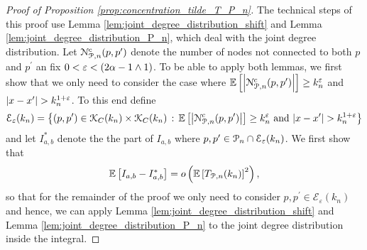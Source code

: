 \begin{proof}[Proof of Proposition \ref{prop:concentration_tilde_T_P_n}]
The technical steps of this proof use Lemma \ref{lem:joint_degree_distribution_shift} and Lemma \ref{lem:joint_degree_distribution_P_n}, which deal with the joint degree distribution. Let ${\mathcal N}_{{\mathcal P},n}^c(p,p^\prime)$ denote the number of nodes not connected to both $p$ and $p^\prime$ an fix $0 < \varepsilon < (2\alpha - 1 \wedge 1)$. To be able to apply both lemmas, we first show that we only need to consider the case where $\mathbb{E}\left[\left|{\mathcal N}_{{\mathcal P},n}^c(p,p^\prime)\right|\right] \ge k_n^{\varepsilon}$ and $|x - x^\prime| > k_n^{1+\varepsilon}$. To this end define 
\[
	\mathcal{E}_{\varepsilon}(k_n) = \left\{(p,p^\prime) \in {\mathcal K}_C(k_n) \times {\mathcal K}_C(k_n) 
	\, : \, \mathbb{E}\left[\left|{\mathcal N}_{{\mathcal P},n}^c(p,p^\prime)\right|\right] \ge k_n^{\varepsilon} \text{ and } |x - x^\prime| > k_n^{1 + \varepsilon} \right\}
\]
and let $I_{a,b}^\ast$ denote the the part of $I_{a,b}$ where $p,p^\prime \in {\mathcal P}_n \cap \mathcal{E}_\varepsilon(k_n)$. We first show that
\begin{eqnarray}\label{eq:I_ab_ast_main}
	\mathbb{E}\left[I_{a,b} - I_{a,b}^\ast\right] = o\left(\mathbb{E}\left[T_{{\mathcal P},n}(k_n)\right]^2\right),
\end{eqnarray}
so that for the remainder of the proof we only need to consider $p, p^\prime \in \mathcal{E}_\varepsilon(k_n)$ and hence, we can apply Lemma \ref{lem:joint_degree_distribution_shift} and Lemma \ref{lem:joint_degree_distribution_P_n} to the joint degree distribution inside the integral.


\end{proof}
